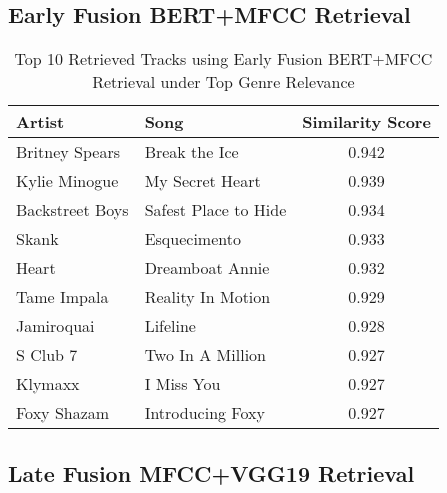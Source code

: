 \documentclass[sigconf]{acmart}
\begin{document}
\subsection{Early Fusion BERT+MFCC Retrieval}


\begin{table}[H]
    \centering
    \caption{Top 10 Retrieved Tracks using Early Fusion BERT+MFCC Retrieval under Top Genre Relevance}
    \label{tab:retrieved_early_fusion_top_genre_specific}
    \footnotesize
    \begin{tabular}{l l c}
        \toprule
        \textbf{Artist} & \textbf{Song} & \textbf{Similarity Score} \\
        \midrule
        Britney Spears & Break the Ice & 0.942 \\
        Kylie Minogue & My Secret Heart & 0.939 \\
        Backstreet Boys & Safest Place to Hide & 0.934 \\
        Skank & Esquecimento & 0.933 \\
        Heart & Dreamboat Annie & 0.932 \\
        Tame Impala & Reality In Motion & 0.929 \\
        Jamiroquai & Lifeline & 0.928 \\
        S Club 7 & Two In A Million & 0.927 \\
        Klymaxx & I Miss You & 0.927 \\
        Foxy Shazam & Introducing Foxy & 0.927 \\
        \bottomrule
    \end{tabular}
\end{table}

\subsection{Late Fusion MFCC+VGG19 Retrieval}

\end{document}
